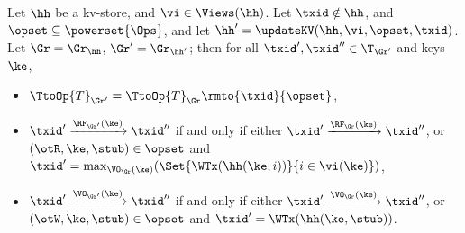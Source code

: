 \begin{lemma}
\label{lem:graph.update}
Let $\hh$ be a kv-store, and $\vi \in \Views(\hh)$. Let $\txid \notin \hh$, and 
$\opset \subseteq \powerset{\Ops}$, and let $\hh' = \updateKV(\hh, \vi, \opset, \txid)$. 
Let $\Gr = \Gr_{\hh}$, $\Gr' = \Gr_{\hh'}$; then for all $\txid', \txid'' \in \T_{\Gr'}$ and keys $\ke$, 
\begin{itemize}
\item $\TtoOp{T}_{\Gr'} = \TtoOp{T}_{\Gr}\rmto{\txid}{\opset}$, 
\item $\txid' \xrightarrow{\RF_{\Gr'}(\ke)} \txid''$ if and only if either 
$\txid' \xrightarrow{\RF_{\Gr}(\ke)} \txid''$, or $(\otR, \ke, \stub) \in \opset$ and 
$\txid' = \max_{\VO_{\Gr}(\ke)}(\Set{\WTx(\hh(\ke, i)) }{ i \in \vi(\ke)})$, 
\item $\txid' \xrightarrow{\VO_{\Gr'}(\ke)} \txid''$ if and only if either 
$\txid' \xrightarrow{\VO_{\Gr}(\ke)} \txid''$, or $(\otW, \ke, \stub) \in \opset$ 
and $\txid' = \WTx(\hh(\ke, \stub))$. 
\end{itemize}
\end{lemma}

